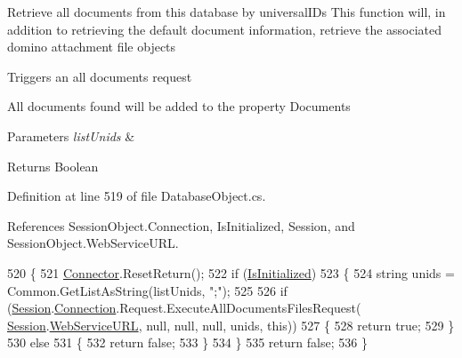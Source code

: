 Retrieve all documents from this database by universal\+I\+Ds This function will, in addition to retrieving the default document information, retrieve the associated domino attachment file objects 

Triggers an all documents request

All documents found will be added to the property \textquotesingle{}Documents\textquotesingle{}


\begin{DoxyParams}{Parameters}
{\em list\+Unids} & \\
\hline
\end{DoxyParams}
\begin{DoxyReturn}{Returns}
Boolean
\end{DoxyReturn}


Definition at line 519 of file Database\+Object.\+cs.



References Session\+Object.\+Connection, Is\+Initialized, Session, and Session\+Object.\+Web\+Service\+U\+RL.


\begin{DoxyCode}
520     \{
521         \mbox{\hyperlink{class_connector}{Connector}}.ResetReturn();
522         \textcolor{keywordflow}{if} (\mbox{\hyperlink{class_database_object_a5fe036d32a30eb10d1b3f6a30263f740}{IsInitialized}})
523         \{
524             \textcolor{keywordtype}{string} unids = Common.GetListAsString(listUnids, \textcolor{stringliteral}{";"});
525 
526             \textcolor{keywordflow}{if} (\mbox{\hyperlink{class_database_object_aa8484162b7d2a7c4c9426bca13c64c07}{Session}}.\mbox{\hyperlink{class_session_object_a014bdbf705a753540e19bfb53030c55c}{Connection}}.Request.ExecuteAllDocumentsFilesRequest(
      \mbox{\hyperlink{class_database_object_aa8484162b7d2a7c4c9426bca13c64c07}{Session}}.\mbox{\hyperlink{class_session_object_a697c071c812fbf7ad1166b896fb44c16}{WebServiceURL}}, null, null, null, unids, \textcolor{keyword}{this}))
527             \{
528                 \textcolor{keywordflow}{return} \textcolor{keyword}{true};
529             \}
530             \textcolor{keywordflow}{else}
531             \{
532                 \textcolor{keywordflow}{return} \textcolor{keyword}{false};
533             \}
534         \}
535         \textcolor{keywordflow}{return} \textcolor{keyword}{false};
536     \}
\end{DoxyCode}
\mbox{\label{class_database_object_a6bfb480373a7e2bdbeaa67e4e3303a3a}} 

